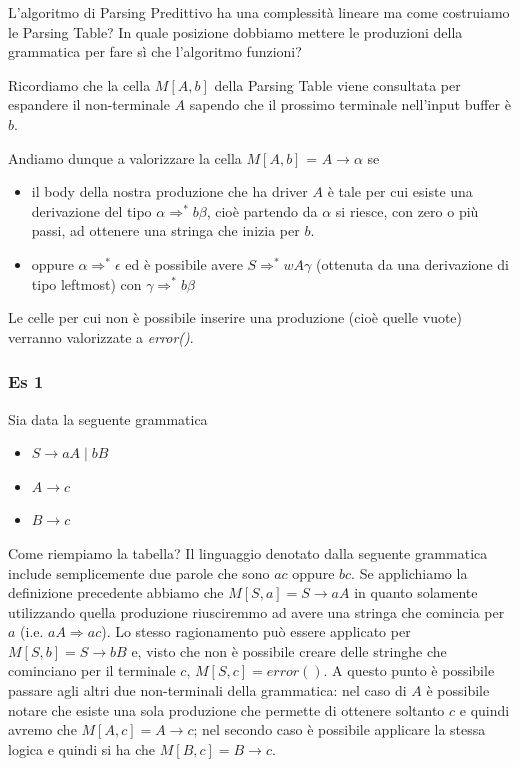 \documentclass[class=book, crop=false, oneside, 12pt]{standalone}
\begin{document}
L'algoritmo di Parsing Predittivo ha una complessità lineare ma come costruiamo le Parsing Table? In quale posizione dobbiamo mettere le produzioni della grammatica per fare sì che l'algoritmo funzioni?

Ricordiamo che la cella \(M[A, b]\) della Parsing Table viene consultata per espandere il non-terminale \(A\) sapendo che il prossimo terminale nell'input buffer è \(b\).

Andiamo dunque a valorizzare la cella \(M[A, b]\) = \(A \rightarrow \alpha\) se

\begin{itemize}
    \item il body della nostra produzione che ha driver \(A\) è tale per cui esiste una derivazione del tipo \(\alpha \Rightarrow^* b \beta\), cioè partendo da \(\alpha\) si riesce, con zero o più passi, ad ottenere una stringa che inizia per \(b\).
    \item oppure \(\alpha \Rightarrow^* \epsilon\) ed è possibile avere \(S \Rightarrow^* w A \gamma\) (ottenuta da una derivazione di tipo leftmost) con \(\gamma \Rightarrow^* b \beta\)
\end{itemize}

Le celle per cui non è possibile inserire una produzione (cioè quelle vuote) verranno valorizzate a \emph{error()}.

\subsubsection{Es 1}

Sia data la seguente grammatica
\begin{itemize}
    \item[] \(S \rightarrow aA \mid bB\)
    \item[] \(A \rightarrow c\)
    \item[] \(B \rightarrow c\)
\end{itemize}

Come riempiamo la tabella? Il linguaggio denotato dalla seguente grammatica include semplicemente due parole che sono \(ac\) oppure \(bc\). Se applichiamo la definizione precedente abbiamo che \(M[S, a] = S \rightarrow aA\) in quanto solamente utilizzando quella produzione riusciremmo ad avere una stringa che comincia per \(a\) (i.e. \(aA \Rightarrow ac\)). Lo stesso ragionamento può essere applicato per \(M[S, b] = S \rightarrow bB\) e, visto che non è possibile creare delle stringhe che cominciano per il terminale \(c\), \(M[S, c] = error()\). A questo punto è possibile passare agli altri due non-terminali della grammatica: nel caso di \(A\) è possibile notare che esiste una sola produzione che permette di ottenere soltanto \(c\) e quindi avremo che \(M[A, c] = A \rightarrow c\); nel secondo caso è possibile applicare la stessa logica e quindi si ha che \(M[B, c] = B \rightarrow c\).
\end{document}
